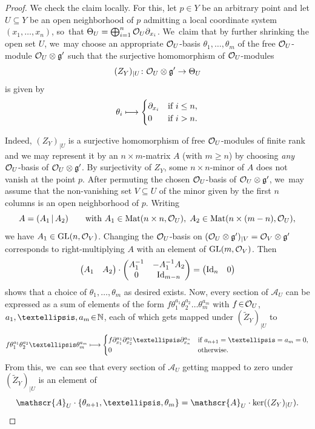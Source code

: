 \documentclass[11pt]{article}
\newcommand\mto{\mathchoice{\longmapsto}{\mapsto}{\mapsto}{\mapsto}}
\newcommand{\cA}{\mathscr{A}}
\newcommand{\frg}{\mathfrak{g}}
\DeclareMathOperator{\GL}{\textup{GL}}
\DeclareMathOperator{\Id}{Id}
\newcommand\restr[2]{{#1_{| {#2}}}}
\newcommand\restrK[2]{{(#1)_{| {#2}}}}
\begin{document}
\begin{proof}
We check the claim locally. For this, let $p \in Y$ be an arbitrary point and let $U \subseteq Y$ be an open neighborhood of $p$ admitting a local coordinate system $(x_1,\dots,x_n)$, so~that $\Theta_U = \bigoplus_{i=1}^n \mathcal{O}_U \partial_{x_i}$. We~claim that by further shrinking the open set $U$, we~may choose
an appropriate $\mathcal{O}_U$-basis $\theta_1,\dots,\theta_m$ of the free $\mathcal{O}_U$\nobreakdash-mod\-ule $\O_U \otimes \frg'$ such that the surjective homomorphism of $\mathcal{O}_U$\nobreakdash-mod\-ules
\[
\restrK{Z_Y}{U} \colon \O_U \otimes \frg' \to \Theta_U
\]
is given by
\[
\theta_i \mto 
\begin{cases} \partial_{x_i} &\text{if } i \leq n, \\ 0 &\text{if } i > n. \end{cases}
\]

Indeed, $\restrK{Z_Y}{U}$ is a surjective homomorphism of free $\mathcal{O}_U$\nobreakdash-mod\-ules of finite rank and we may represent it by an $n \times m$-matrix $A$ (with $m \geq n$) by choosing \emph{any} $\mathcal{O}_U$\nobreakdash-basis of $\O_U \otimes \frg'$. By surjectivity of $Z_Y$, some $n \times n$-minor of $A$ does not vanish at the point $p$. After permuting the chosen $\mathcal{O}_U$-basis of $\O_U \otimes \frg'$, we~may assume that the non-vanishing set $V \subseteq U$ of the minor given by the first $n$ columns is an open neighborhood of $p$. Writing\vspace*{-3pt}
\[
A = (A_1 \, | \, A_2) \qquad \text{with } A_1 \in \operatorname{Mat}(n\times n,\mathcal{O}_U),\; A_2 \in \operatorname{Mat}(n\times (m-n),\mathcal{O}_U),
\]
we have $A_1 \in \GL(n,\O_V)$. Changing the $\mathcal{O}_U$-basis on $\restr{(\O_U \otimes \frg')}{V} = \O_V \otimes \frg'$ corresponds to right-multiplying $A$ with an element of $\GL(m,\O_V)$. Then
\[
\begin{pmatrix}
A_1 & A_2
\end{pmatrix} \cdot
\begin{pmatrix}
\arraycolsep3.5pt
A_1^{-1} & -A_1^{-1}A_2 \\
0 & \Id_{m-n}
\end{pmatrix} =
\begin{pmatrix}
\Id_n & 0
\end{pmatrix}
\]
shows that a choice of $\theta_1,\dots, \theta_m$ as desired exists.
Now, every section of $\cA_U$ can be expressed as a sum of elements of the form $f \theta_1^{a_1} \theta_2^{a_2} \dots \theta_m^{a_m}$ with $f \!\in\! \mathcal{O}_U$, \hbox{$a_1,\dots,a_m \!\in\! \N$}, each of which gets mapped under $\restrK{\tilde{Z}_Y}{U}$ to\vspace*{-3pt}
\[
f \theta_1^{a_1} \theta_2^{a_2} \dots \theta_m^{a_m} \mto 
\begin{cases}
f \partial_{x_1}^{a_1} \partial_{x_2}^{a_2} \dots \partial_{x_n}^{a_n} &\text{if } a_{n+1} = \dots = a_m = 0, \\
0 &\text{otherwise.}
\end{cases}
\]
From this, we~can see that every section of $\cA_U$ getting mapped to zero under $\restrK{\tilde{Z}_Y}{U}$ is an element of\vspace*{-3pt}
\[
\cA_U \cdot \{\theta_{n+1},\dots,\theta_m\} = \cA_U \cdot \ker(\restrK{Z_Y}{U}). \qedhere
\]
\end{proof}
\end{document}
